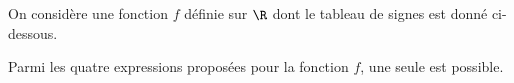 
On considère une fonction $f$ définie sur $\R$ dont le tableau de signes est donné ci-dessous.

\smallskip

\hfill{}\hfill\null

\smallskip

Parmi les quatre expressions proposées pour la fonction $f$, une seule est possible.

\smallskip

